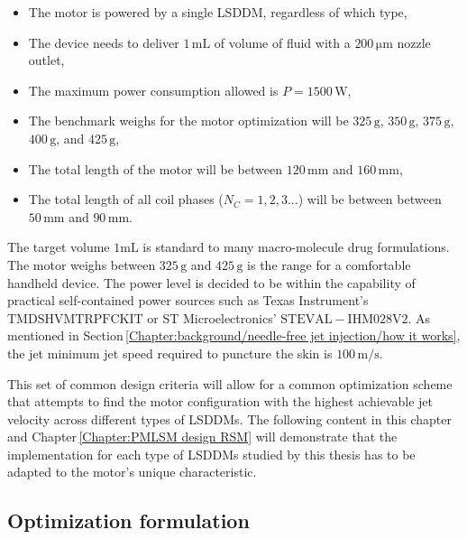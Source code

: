         
        \begin{itemize}
            \item The motor is powered by a single \acs{LSDDM}, regardless of which type,
            \item The device needs to deliver $1\,\mathrm{mL}$ of volume of fluid with a $200\,\mathrm{\mu m}$ nozzle outlet,
            \item The maximum power consumption allowed is $P=1500\,\mathrm{W}$,
            \item The benchmark weighs for the motor optimization will be $325\,\mathrm{g}$, $350\,\mathrm{g}$, $375\,\mathrm{g}$, $400\,\mathrm{g}$, and $425\,\mathrm{g}$,
            \item The total length of the motor will be between $120\,\mathrm{mm}$ and $160\,\mathrm{mm}$,
            \item The total length of all coil phases ($N_C=1,2,3...$) will be between between $50\,\mathrm{mm}$ and $90\,\mathrm{mm}$.
        \end{itemize}
        
        
        The target volume $1\mathrm{mL}$ is standard to many macro-molecule drug formulations. The motor weighs between $325\,\mathrm{g}$ and $425\,\mathrm{g}$ is the range for a comfortable handheld device. The power level is decided to be within the capability of practical self-contained power sources such as Texas Instrument's $\mathrm{TMDSHVMTRPFCKIT}$ or ST Microelectronics' $\mathrm{STEVAL-IHM028V2}$. As mentioned in Section\,\ref{Chapter:background/needle-free jet injection/how it works}, the jet minimum jet speed required to puncture the skin is $100\,\mathrm{m/s}$. 
        
        
        This set of common design criteria will allow for a common optimization scheme that attempts to find the motor configuration with the highest achievable jet velocity across different types of \acsp{LSDDM}. The following content in this chapter and Chapter\,\ref{Chapter:PMLSM design RSM} will demonstrate that the implementation for each type of \acsp{LSDDM} studied by this thesis has to be adapted to the motor's unique characteristic.
        

    \subsection{Optimization formulation}       \label{Chapter:PMLSM design HM/design optimization/optimization formulation}
    
